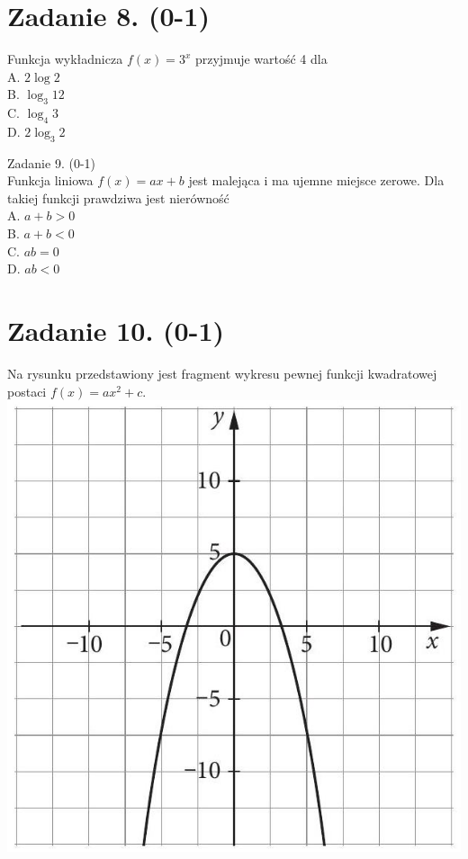 \documentclass[10pt]{article}
\begin{document}
\section*{Zadanie 8. (0-1)}
Funkcja wykładnicza \(f(x)=3^{x}\) przyjmuje wartość 4 dla\\
A. \(2 \log 2\)\\
B. \(\log _{3} 12\)\\
C. \(\log _{4} 3\)\\
D. \(2 \log _{3} 2\)

Zadanie 9. (0-1)\\
Funkcja liniowa \(f(x)=a x+b\) jest malejąca i ma ujemne miejsce zerowe. Dla takiej funkcji prawdziwa jest nierówność\\
A. \(a+b>0\)\\
B. \(a+b<0\)\\
C. \(a b=0\)\\
D. \(a b<0\)

\section*{Zadanie 10. (0-1)}
Na rysunku przedstawiony jest fragment wykresu pewnej funkcji kwadratowej postaci \(f(x)=a x^{2}+c\).\\
\includegraphics[max width=\textwidth, center]{2024_11_21_dd21f7544b65bcf1b3c7g-04}
\end{document}
